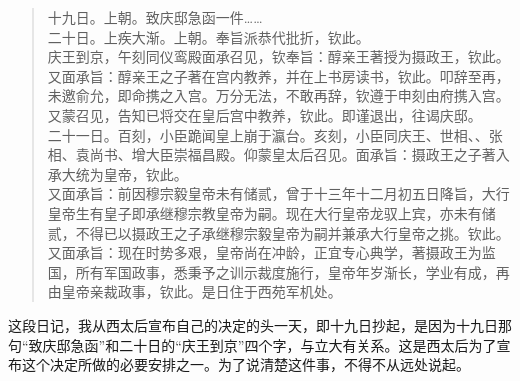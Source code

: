 \begin{quote}
	十九日。上朝。致庆邸急函一件……\\

二十日。上疾大渐。上朝。奉旨派恭代批折，钦此。\\

庆王到京，午刻同仪鸾殿面承召见，钦奉旨：醇亲王著授为摄政王，钦此。\\

又面承旨：醇亲王之子著在宫内教养，并在上书房读书，钦此。叩辞至再，未邀俞允，即命携之入宫。万分无法，不敢再辞，钦遵于申刻由府携入宫。又蒙召见，告知已将交在皇后宫中教养，钦此。即谨退出，往谒庆邸。\\

二十一日。百刻，小臣跪闻皇上崩于瀛台。亥刻，小臣同庆王、世相、、张相、袁尚书、增大臣崇福昌殿。仰蒙皇太后召见。面承旨：摄政王之子著入承大统为皇帝，钦此。\\

又面承旨：前因穆宗毅皇帝未有储贰，曾于十三年十二月初五日降旨，大行皇帝生有皇子即承继穆宗教皇帝为嗣。现在大行皇帝龙驭上宾，亦未有储贰，不得已以摄政王之子承继穆宗毅皇帝为嗣并兼承大行皇帝之挑。钦此。\\

又面承旨：现在时势多艰，皇帝尚在冲龄，正宜专心典学，著摄政王为监国，所有军国政事，悉秉予之训示裁度施行，皇帝年岁渐长，学业有成，再由皇帝亲裁政事，钦此。是日住于西苑军机处。\\
\end{quote}

这段日记，我从西太后宣布自己的决定的头一天，即十九日抄起，是因为十九日那句“致庆邸急函”和二十日的“庆王到京”四个字，与立大有关系。这是西太后为了宣布这个决定所做的必要安排之一。为了说清楚这件事，不得不从远处说起。\\

